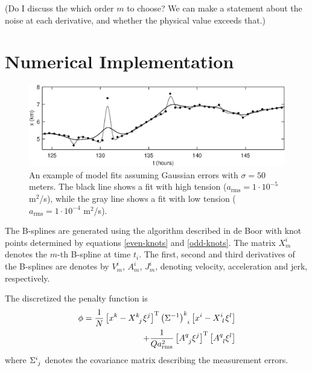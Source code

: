 \documentclass[twocol]{ametsoc}
\begin{document}
(Do I discuss the which order $m$ to choose? We can make a statement about the noise at each derivative, and whether the physical value exceeds that.)

%
\section{Numerical Implementation}
%

\begin{figure}[t]
  \centerline{\includegraphics[width=39pc,angle=0]{gaussianfit}}
  
  \caption{An example of model fits assuming Gaussian errors with $\sigma=50$ meters. The black line shows a fit with high tension ($a_{\textrm{rms}}=1 \cdot 10^{-5}$ m$^2$/s), while the gray line shows a fit with  low tension ($a_{\textrm{rms}}=1 \cdot 10^{-4}$ m$^2$/s).}
  \label{gaussianfit}
\end{figure}


The B-splines are generated using the algorithm described in de Boor with knot points determined by equations \ref{even-knots} and \ref{odd-knots}. The matrix $X^i_m$ denotes the $m$-th B-spline at time $t_i$. The first, second and third derivatives of the B-splines are denotes by $V^i_m$, $A^i_m$, $J^i_m$, denoting velocity, acceleration and jerk, respectively.

The discretized the penalty function is
\begin{equation}
\begin{split}
\phi = \frac{1}{N} \left[ x^k - X\indices{^k_j} \xi^j \right]^{\textrm{T}} \left(\Sigma^{-1}\right)\indices{^k_i} \left[ x^i - X\indices{^i_l} \xi^l \right] \\
+ \frac{1}{Q a_{\textrm{rms}}^2} \left[A\indices{^q_j} \xi^j \right]^{\textrm{T}} \left[ A\indices{^q_l} \xi^l \right]
\end{split}
\end{equation}
where $\Sigma\indices{^i_j}$ denotes the covariance matrix describing the measurement errors.
\end{document}
